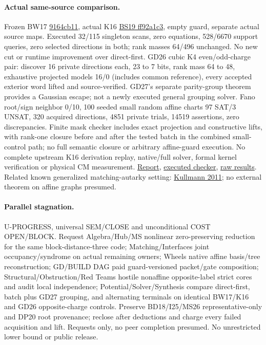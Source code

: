 \documentclass[11pt]{article}
\begin{document}
\paragraph{Actual same-source comparison.}
Frozen BW17 \href{https://github.com/j15marti/pnp/commit/9164cb11c6fcdf96d470de9d86b061e3201a591f}{9164cb11}, actual K16 \href{https://github.com/j15marti/pnp/commit/ff92a1c3d44e4b48dc9a7bf215825075396cae5a}{BS19 ff92a1c3}, empty guard, separate actual source maps. Executed 32/115 singleton scans, zero equations, 528/6670 support queries, zero selected directions in both; rank masses 64/496 unchanged. No new cut or runtime improvement over direct-first. GD26 cubic K4 even/odd-charge pair: discover 16 private directions each, 23 to 7 bits, rank mass 64 to 48, exhaustive projected models 16/0 (includes common reference), every accepted exterior word lifted and source-verified. GD27's separate parity-group theorem provides a Gaussian escape; not a newly executed general grouping solver. Fano root/sign neighbor 0/10, 100 seeded small random affine charts 97 SAT/3 UNSAT, 320 acquired directions, 4851 private trials, 14519 assertions, zero discrepancies. Finite mask checker includes exact projection and constructive lifts, with rank-one closure before and after the tested batch in the combined small-control path; no full semantic closure or arbitrary affine-guard execution. No complete upstream K16 derivation replay, native/full solver, formal kernel verification or physical CM measurement. \href{https://github.com/j15marti/pnp/commit/894f022b853d3f1b3002c7e64c7f9c35dbb8101c}{Report}, \href{https://github.com/j15marti/pnp/commit/d0d03a437a4bec86ee14a3bbbd45721de8a5c08c}{executed checker}, \href{https://github.com/j15marti/pnp/commit/48804e4f18b86990f6dee8a84d07b456ccfb6518}{raw results}. Related known generalized matching-autarky setting: \href{https://doi.org/10.3233/FI-2011-428}{Kullmann 2011}; no external theorem on affine graphs presumed.
 
\paragraph{Parallel stagnation.}
U-PROGRESS, universal SEM/CLOSE and unconditional COST OPEN/BLOCK. Request Algebra/Hub/MS nonlinear zero-preserving reduction for the same block-distance-three code; Matching/Interfaces joint occupancy/syndrome on actual remaining owners; Wheels native affine basis/tree reconstruction; GD/BUILD DAG paid guard-versioned packet/gate composition; Structural/Obstruction/Red Teams hostile nonaffine opposite-label strict cores and audit local independence; Potential/Solver/Synthesis compare direct-first, batch plus GD27 grouping, and alternating terminals on identical BW17/K16 and GD26 opposite-charge controls. Preserve BD18/I25/MS26 representative-only and DP20 root provenance; reclose after deductions and charge every failed acquisition and lift. Requests only, no peer completion presumed. No unrestricted lower bound or public release.
\end{document}
